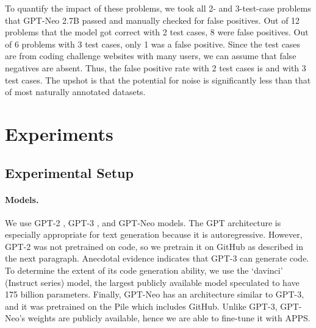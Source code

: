 \documentclass{article}
\begin{document}
To quantify the impact of these problems, we took all 2- and 3-test-case problems that GPT-Neo 2.7B passed and manually checked for false positives. Out of 12 problems that the model got correct with 2 test cases, 8 were false positives. Out of 6 problems with 3 test cases, only 1 was a false positive. Since the test cases are from coding challenge websites with many users, we can assume that false negatives are absent. Thus, the false positive rate with 2 test cases is  and  with 3 test cases. The upshot is that the potential for noise is significantly less than that of most naturally annotated datasets. \section{Experiments}







\subsection{Experimental Setup}







\paragraph{Models.}
We use GPT-2 \citep{radford2019language}, GPT-3 \citep{Brown2020LanguageMA}, and GPT-Neo \citep{gpt-neo} models. The GPT architecture is especially appropriate for text generation because it is autoregressive. However, GPT-2 was not pretrained on code, so we pretrain it on GitHub as described in the next paragraph. Anecdotal evidence indicates that GPT-3 can generate code. To determine the extent of its code generation ability, we use the `davinci' (Instruct series) model, the largest publicly available model speculated to have 175 billion parameters. Finally, GPT-Neo has an architecture similar to GPT-3, and it was pretrained on the Pile \citep{gao2020pile} which includes GitHub. Unlike GPT-3, GPT-Neo's weights are publicly available, hence we are able to fine-tune it with APPS.
\end{document}
